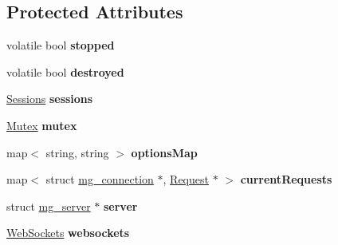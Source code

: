 \subsection*{Protected Attributes}
\begin{DoxyCompactItemize}
\item 
volatile bool {\bfseries stopped}\hypertarget{classMongoose_1_1Server_ae9e6d0dda9b7ac94d1c1c3a5f676bcdb}{}\label{classMongoose_1_1Server_ae9e6d0dda9b7ac94d1c1c3a5f676bcdb}

\item 
volatile bool {\bfseries destroyed}\hypertarget{classMongoose_1_1Server_a6d62e877360c2f692515deaec026a899}{}\label{classMongoose_1_1Server_a6d62e877360c2f692515deaec026a899}

\item 
\hyperlink{classMongoose_1_1Sessions}{Sessions} {\bfseries sessions}\hypertarget{classMongoose_1_1Server_a96c6d2a83d60a718cfb828314f27bc1e}{}\label{classMongoose_1_1Server_a96c6d2a83d60a718cfb828314f27bc1e}

\item 
\hyperlink{classMongoose_1_1Mutex}{Mutex} {\bfseries mutex}\hypertarget{classMongoose_1_1Server_a904a15c2ef0898687f71803802e5d6c9}{}\label{classMongoose_1_1Server_a904a15c2ef0898687f71803802e5d6c9}

\item 
map$<$ string, string $>$ {\bfseries options\+Map}\hypertarget{classMongoose_1_1Server_a684c094cf39754b73785b0f586d5a4e6}{}\label{classMongoose_1_1Server_a684c094cf39754b73785b0f586d5a4e6}

\item 
map$<$ struct \hyperlink{structmg__connection}{mg\+\_\+connection} $\ast$, \hyperlink{classMongoose_1_1Request}{Request} $\ast$ $>$ {\bfseries current\+Requests}\hypertarget{classMongoose_1_1Server_adedb1fd1406329834ca5901506bbb39c}{}\label{classMongoose_1_1Server_adedb1fd1406329834ca5901506bbb39c}

\item 
struct \hyperlink{structmg__server}{mg\+\_\+server} $\ast$ {\bfseries server}\hypertarget{classMongoose_1_1Server_a305c65cdcb023600f84c40840a80fc7a}{}\label{classMongoose_1_1Server_a305c65cdcb023600f84c40840a80fc7a}

\item 
\hyperlink{classMongoose_1_1WebSockets}{Web\+Sockets} {\bfseries websockets}\hypertarget{classMongoose_1_1Server_ab2b9fe0d35a1d714fa69fd0bd70b964e}{}\label{classMongoose_1_1Server_ab2b9fe0d35a1d714fa69fd0bd70b964e}


\end{DoxyCompactItemize}
